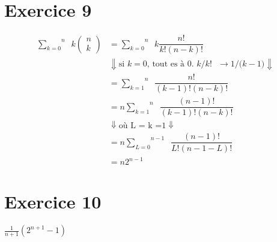 \documentclass[fontsize=10pt]{article}
\begin{document}
\section*{Exercice 9}
\begin{align*}
\overset{n}{\underset{k= 0}{\sum}}
\phantom{a}k
\begin{pmatrix} 
n\\
k
\end{pmatrix}
& = \overset{n}{\underset{k= 0}{\sum}}
\phantom{a}k\dfrac{n!}{k!(n-k)!}\\
&\Downarrow\text{si $k=0$, tout es à 0. $k/k!$ $\rightarrow 1/(k-1$)}\Downarrow\\
& = \overset{n}{\underset{k= 1}{\sum}}
\phantom{a}\dfrac{n!}{(k-1)!(n-k)!}\\
& = n\overset{n}{\underset{k= 1}{\sum}}
\phantom{a}\dfrac{(n-1)!}{(k-1)!(n-k)!}\\
&\Downarrow\text{où L = k =1}\Downarrow\\
& = n\overset{n-1}{\underset{L= 0}{\sum}}
\phantom{a}\dfrac{(n-1)!}{L!(n-1-L)!}\\
&= n2^{n-1}
\end{align*}






\section*{Exercice 10}
$\frac{1}{n+1}(2^{n+1}-1)$
\end{document}
